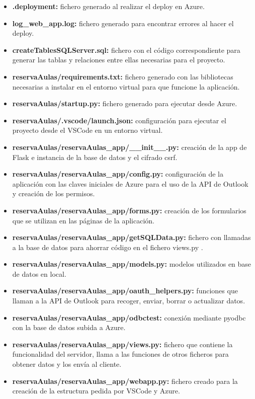 \begin{itemize}
    \item \textbf{.deployment:} fichero generado al realizar el deploy en Azure.
    \item \textbf{log\_web\_app.log:} fichero generado para encontrar errores al hacer el deploy.
    \item \textbf{createTablesSQLServer.sql:} fichero con el código correspondiente para generar las tablas y relaciones entre ellas necesarias para el proyecto.
    \item \textbf{reservaAulas/requirements.txt:} fichero generado con las bibliotecas necesarias a instalar en el entorno virtual para que funcione la aplicación.
    \item \textbf{reservaAulas/startup.py:} fichero generado para ejecutar desde Azure.
    \item \textbf{reservaAulas/.vscode/launch.json:} configuración para ejecutar el proyecto desde el VSCode en un entorno virtual.
    \item \textbf{reservaAulas/reservaAulas\_app/\_\_init\_\_.py:} creación de la app de Flask e instancia de la base de datos y el cifrado csrf.
    \item \textbf{reservaAulas/reservaAulas\_app/config.py:} configuración de la aplicación con las claves iniciales de Azure para el uso de la API de Outlook y creación de los permisos.
    \item \textbf{reservaAulas/reservaAulas\_app/forms.py:} creación de los formularios que se utilizan en las páginas de la aplicación.
    \item \textbf{reservaAulas/reservaAulas\_app/getSQLData.py:} fichero con llamadas a la base de datos para ahorrar código en el fichero views.py .
    \item \textbf{reservaAulas/reservaAulas\_app/models.py:} modelos utilizados en base de datos en local.
    \item \textbf{reservaAulas/reservaAulas\_app/oauth_helpers.py:} funciones que llaman a la API de Outlook para recoger, enviar, borrar o actualizar datos.
    \item \textbf{reservaAulas/reservaAulas\_app/odbctest:} conexión mediante pyodbc con la base de datos subida a Azure.
    \item \textbf{reservaAulas/reservaAulas\_app/views.py:} fichero que contiene la funcionalidad del servidor, llama a las funciones de otros ficheros para obtener datos y los envía al cliente.
    \item \textbf{reservaAulas/reservaAulas\_app/webapp.py:} fichero creado para la creación de la estructura pedida por VSCode y Azure.

\end{itemize}
